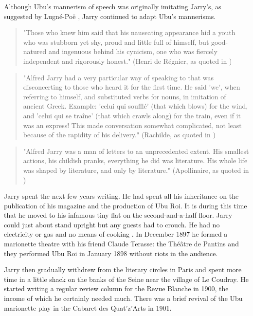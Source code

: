 Although Ubu's mannerism of speech was originally imitating Jarry's, as suggested by Lugné-Poë \citep[p.155]{Brotchie2011}, Jarry continued to adapt Ubu's mannerisms.

\begin{quote}
  "Those who knew him said that his nauseating appearance hid a youth who was stubborn yet shy, proud and little full of himself, but good-natured and ingenuous behind his cynicism, one who was fiercely independent and rigorously honest." (Henri de Régnier, as quoted in \citep[p.181]{Brotchie2011})
\end{quote}

\begin{quote}
  "Alfred Jarry had a very particular way of speaking to that was disconcerting to those who heard it for the first time. He said 'we', when referring to himself, and substituted verbs for nouns, in imitation of ancient Greek. Example: 'celui qui soufflé' (that which blows) for the wind, and 'celui qui se traîne' (that which crawls along) for the train, even if it was an express! This made conversation somewhat complicated, not least because of the rapidity of his delivery." (Rachilde, as quoted in \citep[p.181]{Brotchie2011})
\end{quote}

\begin{quote}
  "Alfred Jarry was a man of letters to an unprecedented extent. His smallest actions, his childish pranks, everything he did was literature. His whole life was shaped by literature, and only by literature." (Apollinaire, as quoted in \citep[p.307]{Brotchie2011})
\end{quote}

Jarry spent the next few years writing. He had spent all his inheritance on the publication of his magazine and the production of Ubu Roi. It is during this time that he moved to his infamous tiny flat on the second-and-a-half floor. Jarry could just about stand upright but any guests had to crouch. He had no electricity or gas and no means of cooking \citep[p.195]{Brotchie2011}. In December 1897 he formed a marionette theatre with his friend Claude Terasse: the Théâtre de Pantins and they performed Ubu Roi in January 1898 without riots in the audience.

Jarry then gradually withdrew from the literary circles in Paris and spent more time in a little shack on the banks of the Seine near the village of Le Coudray. He started writing a regular review column for the Revue Blanche in 1900, the income of which he certainly needed much. There was a brief revival of the Ubu marionette play in the Cabaret des Quat'z'Arts in 1901.

